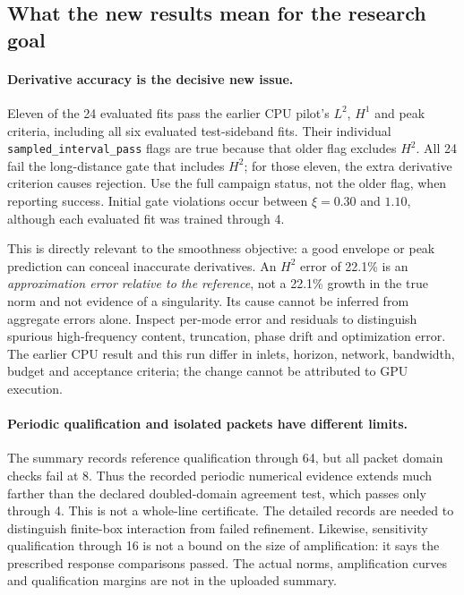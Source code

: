 \documentclass[11pt]{article}
\begin{document}
\newpage
\subsection{What the new results mean for the research goal}
\paragraph{Derivative accuracy is the decisive new issue.}
Eleven of the 24 evaluated fits pass the earlier CPU pilot's $L^2$, $H^1$ and
peak criteria, including all six evaluated test-sideband fits. Their individual
\texttt{sampled\_interval\_pass} flags are true because that older flag excludes
$H^2$. All 24 fail the long-distance gate that includes $H^2$; for those eleven,
the extra derivative criterion causes rejection. Use the full campaign status,
not the older flag, when reporting success. Initial gate violations occur between
$\xi=0.30$ and $1.10$, although each evaluated fit was trained through 4.

This is directly relevant to the smoothness objective: a good envelope or peak
prediction can conceal inaccurate derivatives. An $H^2$ error of 22.1\% is an
\emph{approximation error relative to the reference}, not a 22.1\% growth in
the true norm and not evidence of a singularity. Its cause cannot be inferred
from aggregate errors alone. Inspect per-mode error and residuals to distinguish
spurious high-frequency content, truncation, phase drift and optimization error.
The earlier CPU result and this run differ in inlets, horizon, network, bandwidth,
budget and acceptance criteria; the change cannot be attributed to GPU execution.

\paragraph{Periodic qualification and isolated packets have different limits.}
The summary records reference qualification through 64, but all packet domain
checks fail at 8. Thus the recorded periodic numerical evidence extends much
farther than the declared doubled-domain agreement test, which passes only
through 4. This is not a whole-line certificate. The detailed records are needed
to distinguish finite-box interaction from failed refinement. Likewise, sensitivity
qualification through 16 is not a bound on the size of amplification: it says
the prescribed response comparisons passed. The actual norms, amplification
curves and qualification margins are not in the uploaded summary.
\end{document}
